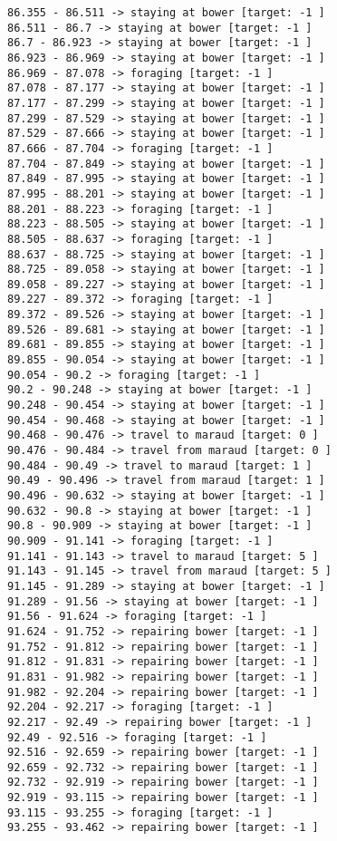 \documentclass[11pt]{article}
\begin{document}
\begin{Verbatim}[commandchars=\\\{\}]
86.355 - 86.511 -> staying at bower [target: -1 ]
86.511 - 86.7 -> staying at bower [target: -1 ]
86.7 - 86.923 -> staying at bower [target: -1 ]
86.923 - 86.969 -> staying at bower [target: -1 ]
86.969 - 87.078 -> foraging [target: -1 ]
87.078 - 87.177 -> staying at bower [target: -1 ]
87.177 - 87.299 -> staying at bower [target: -1 ]
87.299 - 87.529 -> staying at bower [target: -1 ]
87.529 - 87.666 -> staying at bower [target: -1 ]
87.666 - 87.704 -> foraging [target: -1 ]
87.704 - 87.849 -> staying at bower [target: -1 ]
87.849 - 87.995 -> staying at bower [target: -1 ]
87.995 - 88.201 -> staying at bower [target: -1 ]
88.201 - 88.223 -> foraging [target: -1 ]
88.223 - 88.505 -> staying at bower [target: -1 ]
88.505 - 88.637 -> foraging [target: -1 ]
88.637 - 88.725 -> staying at bower [target: -1 ]
88.725 - 89.058 -> staying at bower [target: -1 ]
89.058 - 89.227 -> staying at bower [target: -1 ]
89.227 - 89.372 -> foraging [target: -1 ]
89.372 - 89.526 -> staying at bower [target: -1 ]
89.526 - 89.681 -> staying at bower [target: -1 ]
89.681 - 89.855 -> staying at bower [target: -1 ]
89.855 - 90.054 -> staying at bower [target: -1 ]
90.054 - 90.2 -> foraging [target: -1 ]
90.2 - 90.248 -> staying at bower [target: -1 ]
90.248 - 90.454 -> staying at bower [target: -1 ]
90.454 - 90.468 -> staying at bower [target: -1 ]
90.468 - 90.476 -> travel to maraud [target: 0 ]
90.476 - 90.484 -> travel from maraud [target: 0 ]
90.484 - 90.49 -> travel to maraud [target: 1 ]
90.49 - 90.496 -> travel from maraud [target: 1 ]
90.496 - 90.632 -> staying at bower [target: -1 ]
90.632 - 90.8 -> staying at bower [target: -1 ]
90.8 - 90.909 -> staying at bower [target: -1 ]
90.909 - 91.141 -> foraging [target: -1 ]
91.141 - 91.143 -> travel to maraud [target: 5 ]
91.143 - 91.145 -> travel from maraud [target: 5 ]
91.145 - 91.289 -> staying at bower [target: -1 ]
91.289 - 91.56 -> staying at bower [target: -1 ]
91.56 - 91.624 -> foraging [target: -1 ]
91.624 - 91.752 -> repairing bower [target: -1 ]
91.752 - 91.812 -> repairing bower [target: -1 ]
91.812 - 91.831 -> repairing bower [target: -1 ]
91.831 - 91.982 -> repairing bower [target: -1 ]
91.982 - 92.204 -> repairing bower [target: -1 ]
92.204 - 92.217 -> foraging [target: -1 ]
92.217 - 92.49 -> repairing bower [target: -1 ]
92.49 - 92.516 -> foraging [target: -1 ]
92.516 - 92.659 -> repairing bower [target: -1 ]
92.659 - 92.732 -> repairing bower [target: -1 ]
92.732 - 92.919 -> repairing bower [target: -1 ]
92.919 - 93.115 -> repairing bower [target: -1 ]
93.115 - 93.255 -> foraging [target: -1 ]
93.255 - 93.462 -> repairing bower [target: -1 ]

\end{Verbatim}
\end{document}
